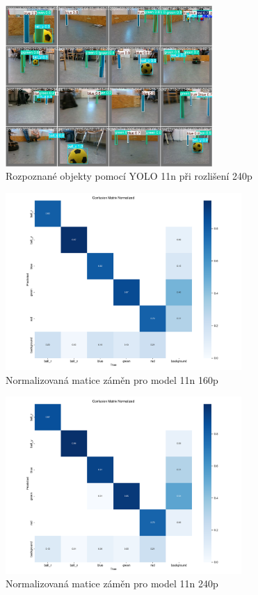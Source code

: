 \documentclass[a4paper,12pt]{article}
\begin{document}
\begin{figure}[H]
    \centering
    \includegraphics[width=0.7\textwidth]{pictures/rozpoznane.jpg}
    \caption{Rozpoznané objekty pomocí YOLO 11n při rozlišení 240p}
    \label{fig:detected_image}
\end{figure}

\begin{figure}[H]
    \centering
    \includegraphics[width=0.8\textwidth]{pictures/v11n_160p.png}
    \caption{Normalizovaná matice záměn pro model 11n 160p}
    \label{fig:confusion_matrix_160p}
\end{figure}

\begin{figure}[H]
    \centering
    \includegraphics[width=0.8\textwidth]{pictures/v11n_240p.png}
    \caption{Normalizovaná matice záměn pro model 11n 240p}
    \label{fig:confusion_matrix_240p}
\end{figure}
\end{document}
